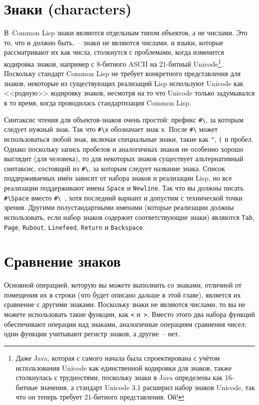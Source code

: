 \section{Знаки (characters)}

В~Common Lisp знаки являются отдельным типом объектов, а не числами.  Это то, что и должно
быть,~-- знаки не являются числами, и языки, которые рассматривают их как числа, столкнутся
с проблемами, когда изменится кодировка знаков, например с 8-битного ASCII на 21-битный
Unicode\footnote{Даже Java, которая с самого начала была спроектирована с учётом
  использования Unicode как единственной кодировки для знаков, также столкнулась с
  трудностями, поскольку знаки в Java определены как 16-битные значения, а стандарт
  Unicode 3.1 расширил набор знаков Unicode, так что он теперь требует 21-битного
  представления.  Ой!}.  Поскольку стандарт Common Lisp не требует конкретного
представления для знаков, некоторые из существующих реализаций Lisp используют Unicode как
<<родную>> кодировку знаков, несмотря на то что Unicode только задумывался в то время,
когда проводилась стандартизация Common Lisp.

Синтаксис чтения для объектов-знаков очень простой: префикс \lstinline!#\!, за которым
следует нужный знак.  Так что \lstinline!#\x! обозначает знак \lstinline{x}.  После
\lstinline!#\! может использоваться любой знак, включая специальные знаки, такие как
\lstinline{"}, \lstinline{(} и пробел.  Однако поскольку запись пробелов и аналогичных знаков не
особенно хорошо выглядит (для человека), то для некоторых знаков существует альтернативный
синтаксис, состоящий из \lstinline!#\!, за которым следует название знака.  Список
поддерживаемых имён зависит от набора знаков и реализации Lisp, но все реализации
поддерживают имена \lstinline{Space} и \lstinline{Newline}.  Так что вы должны писать
\lstinline!#\Space! вместо \lstinline!#\ !, хотя последний вариант и допустим с
технической точки зрения.  Другими полустандартными именами (которые реализации должны
использовать, если набор знаков содержит соответствующие знаки) являются \lstinline{Tab},
\lstinline{Page}, \lstinline{Rubout}, \lstinline{Linefeed}, \lstinline{Return} и \lstinline{Backspace}.

\section{Сравнение знаков}

Основной операцией, которую вы можете выполнить со знаками, отличной от помещения их в
строки (что будет описано дальше в этой главе), является их сравнение с другими знаками.
Поскольку знаки не являются числами, то вы не можете использовать такие функции, как
\lstinline{<} и~\lstinline{>}.  Вместо этого два набора функций обеспечивают операции над знаками,
аналогичные операциям сравнения чисел; одни функции учитывают регистр знаков, а другие~--
нет.

